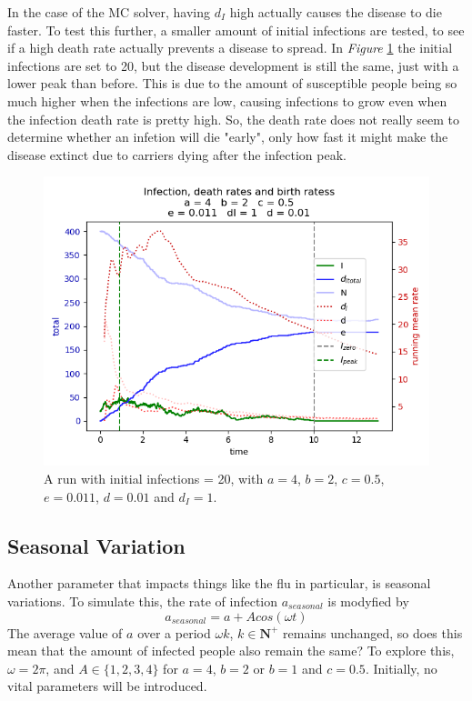 In the case of the MC solver, having $d_I$ high actually causes the disease to die faster. To test this further, a smaller amount of initial infections are tested, to see if a high death rate actually prevents a disease to spread.
In \textit{Figure} \ref{fig:vitalI20} the initial infections are set to 20, but the disease development is still the same, just with a lower peak than before. 
This is due to the amount of susceptible people being so much higher when the infections are low, causing infections to grow even when the infection death rate is pretty high.
So, the death rate does not really seem to determine whether an infetion will die "early", only how fast it might make the disease extinct due to carriers dying after the infection peak.
\begin{figure}[!h]
    \centering
    \includegraphics[scale=0.55]{plots/MC_solver_vitalI20_a_4_b_2_c_0.5_IdI1.png}
    \caption{A run with initial infections = 20, with $a=4$, $b=2$, $c=0.5$, $e=0.011$, $d=0.01$ and $d_I=1$.}
    \label{fig:vitalI20}
\end{figure}


\subsection{Seasonal Variation}
Another parameter that impacts things like the flu in particular, is seasonal variations.
To simulate this, the rate of infection $a_{seasonal}$ is modyfied by
$$
a_{seasonal}=a+Acos(\omega t)
$$
The average value of $a$ over a period $\omega k$, $k \in \mathbf{N} ^+$ remains unchanged, so does this mean that the amount of infected people also remain the same?
To explore this, $\omega = 2 \pi$, and $A \in \{1,2,3,4\}$ for $a=4$, $b=2$ or $b=1$ and $c=0.5$. Initially, no vital parameters will be introduced.

